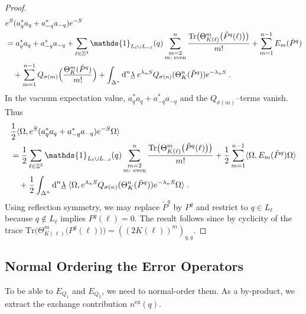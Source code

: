 \documentclass[12pt,a4paper]{article}
\numberwithin{equation}{section}
\newcommand{\1}{\mathbb{I}}
\newcommand{\di}{\textnormal{d}}
\newcommand{\ex}{\mathrm{ex}}
\newcommand{\Zstar}{\mathbb{Z}^3} %
\newcommand{\Z}{\mathbb{Z}}
\newcommand{\half}{\frac{1}{2}}
\theoremstyle{plain}
\theoremstyle{definition}
\theoremstyle{remark}
\theoremstyle{plain}
\theoremstyle{definition}
\theoremstyle{remark}
\begin{document}
\begin{proof}
\begin{align}
	&e^{S} (a_q^* a_q + a_{-q}^* a_{-q}) e^{-S} \nonumber\\
	&= a_q^* a_q + a_{-q}^* a_{-q}
		+ \sum_{\ell\in \Zstar} \mathds{1}_{L_\ell \cup L_{-\ell}}(q) \sum_{\substack{m=2\\m:\textnormal{ even}}}^n \frac{\mathrm{Tr} \big(\Theta^m_{K(\ell)} \big( \tilde{P}^q(\ell) \big) \big)}{m!}
		+ \sum_{m=1}^{n-1} E_m(\tilde{P}^q) \nonumber\\
	&\quad+ \sum_{m=1}^{n-1}
		Q_{\sigma(m)} \Big( \frac{\Theta^m_{K}(\tilde{P}^q)}{m!} \Big)
		+\int_{\Delta^n} \di^n \underline{\lambda} \;
		e^{\lambda_n S}Q_{\sigma(n)}(\Theta^n_K (\tilde{P}^q)) e^{-\lambda_n S} \;.
\end{align}
In the vacuum expectation value, $ a_q^* a_q + a_{-q}^* a_{-q} $ and the $ Q_{\sigma(m)} $--terms vanish. Thus
\begin{align}
	& \half \langle \Omega, e^{S} (a_q^* a_q + a_{-q}^* a_{-q}) e^{-S} \Omega \rangle \nonumber\\
	&= \half \sum_{\ell\in \Zstar} \mathds{1}_{L_\ell \cup L_{-\ell}}(q) \sum_{\substack{m=2\\m:\textnormal{ even}}}^n \frac{\mathrm{Tr} \big(\Theta^m_{K(\ell)} \big( \tilde{P}^q(\ell) \big) \big)}{m!}
	+ \half \sum_{m=1}^{n-1} \langle \Omega, E_m(\tilde{P}^q) \Omega \rangle \nonumber\\
	&\quad + \half \int_{\Delta^n} \di^n \underline{\lambda} \;
		\langle \Omega, e^{\lambda_n S}Q_{\sigma(n)}(\Theta^n_{K}(\tilde{P}^q)) e^{-\lambda_n S} \Omega \rangle \;.
\end{align}
Using reflection symmetry, we may replace $ \tilde{P}^q $ by $ P^q $ and restrict to $ q \in L_\ell $ because $ q \notin L_\ell$ implies $P^q(\ell) = 0 $. The result follows since by cyclicity of the trace $ \mathrm{Tr} \big(\Theta^m_{K(\ell)} \big( P^q(\ell) \big) \big) = ((2K(\ell))^m)_{q,q} $.
\end{proof}






\subsection{Normal Ordering the Error Operators}
\label{sec:extraction_ex}

To be able to $ E_{Q_1} $ and $ E_{Q_2} $, we need to normal-order them. As a by-product, we extract the exchange contribution $ n^{\ex}(q) $.
\end{document}
